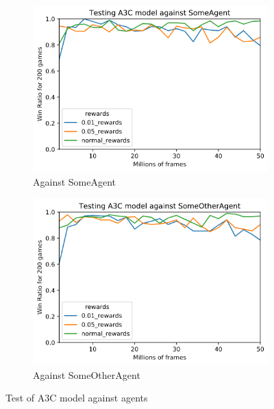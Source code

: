 \begin{figure}[h!]
    \begin{subfigure}{0.49\textwidth}
        \centering
        \includegraphics[width=\textwidth]{figures/a3c-test-someagent.png}
        \caption{Against SomeAgent}
        \label{fig:test-a3c-someagent}
    \end{subfigure}
    \begin{subfigure}{0.49\textwidth}
        \centering
        \includegraphics[width=\textwidth]{figures/a3c-test-someaothergent.png}
        \caption{Against SomeOtherAgent}
        \label{fig:test-a3c-someotheragent}
    \end{subfigure}
    
    \caption{Test of A3C model against agents}
    \label{fig:a3c-testing}
\end{figure}